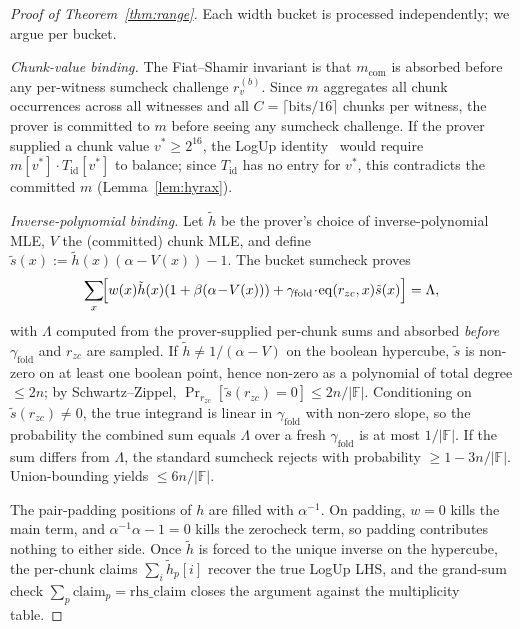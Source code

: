 \documentclass[letterpaper,twocolumn,10pt]{article}
\theoremstyle{remark}
\theoremstyle{definition}
\newcommand{\FF}{\mathbb{F}}
\begin{document}
\begin{proof}[Proof of Theorem~\ref{thm:range}]
Each width bucket is processed independently; we argue per bucket.

\emph{Chunk-value binding.} The Fiat--Shamir invariant is that
$m_{\mathrm{com}}$ is absorbed before any per-witness sumcheck
challenge $r_v^{(b)}$. Since $m$ aggregates all chunk occurrences
across all witnesses and all $C\!=\!\lceil\mathrm{bits}/16\rceil$
chunks per witness, the prover is committed to $m$ before seeing any
sumcheck challenge. If the prover supplied a chunk value
$v^*\!\ge\!2^{16}$, the LogUp identity~\cite{habo2024logup} would
require $m[v^*]\!\cdot\!T_{\mathrm{id}}[v^*]$ to balance; since
$T_{\mathrm{id}}$ has no entry for $v^*$, this contradicts the
committed $m$ (Lemma~\ref{lem:hyrax}).

\emph{Inverse-polynomial binding.} Let $\tilde h$ be the prover's
choice of inverse-polynomial MLE, $V$ the (committed) chunk MLE, and
define $\tilde s(x)\!:=\!\tilde h(x)(\alpha\!-\!V(x))\!-\!1$. The
bucket sumcheck proves
\[
  \sum_x\!\Bigl[w(x)\tilde h(x)(1+\beta(\alpha\!-\!V(x)))
   + \gamma_{\mathrm{fold}}\!\cdot\!\mathrm{eq}(r_{zc},x)\tilde s(x)\Bigr]=\Lambda,
\]
with $\Lambda$ computed from the prover-supplied per-chunk sums and
absorbed \emph{before} $\gamma_{\mathrm{fold}}$ and $r_{zc}$ are
sampled. If $\tilde h\!\ne\!1/(\alpha\!-\!V)$ on the boolean
hypercube, $\tilde s$ is non-zero on at least one boolean point,
hence non-zero as a polynomial of total degree $\le 2n$; by
Schwartz--Zippel, $\Pr_{r_{zc}}[\tilde s(r_{zc})\!=\!0]\!\le\!2n/|\FF|$.
Conditioning on $\tilde s(r_{zc})\!\ne\!0$, the true integrand is
linear in $\gamma_{\mathrm{fold}}$ with non-zero slope, so the
probability the combined sum equals $\Lambda$ over a fresh
$\gamma_{\mathrm{fold}}$ is at most $1/|\FF|$. If the sum differs
from $\Lambda$, the standard sumcheck rejects with probability
$\ge 1\!-\!3n/|\FF|$. Union-bounding yields $\le\!6n/|\FF|$.

The pair-padding positions of $h$ are filled with $\alpha^{-1}$. On
padding, $w\!=\!0$ kills the main term, and
$\alpha^{-1}\alpha\!-\!1\!=\!0$ kills the zerocheck term, so padding
contributes nothing to either side. Once $\tilde h$ is forced to the
unique inverse on the hypercube, the per-chunk claims
$\sum_i\tilde h_p[i]$ recover the true LogUp LHS, and the
grand-sum check $\sum_p\mathrm{claim}_p\!=\!\mathrm{rhs\_claim}$
closes the argument against the multiplicity table.
\end{proof}
\end{document}
